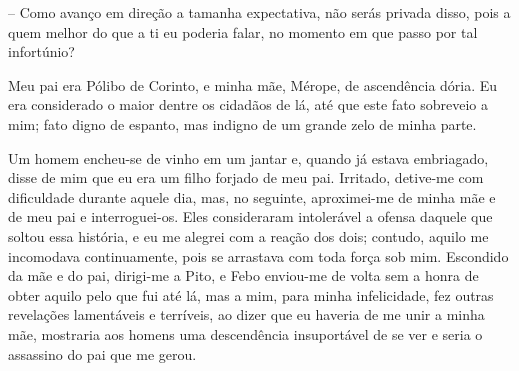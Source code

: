  --   Como avanço em direção a tamanha expectativa, não serás privada disso,
pois a quem melhor do que a ti eu poderia falar, no momento em que passo
por tal infortúnio?

Meu pai era Pólibo de Corinto, e minha mãe, Mérope, de ascendência
dória. Eu era considerado o maior dentre os cidadãos de lá, até que este
fato sobreveio a mim; fato digno de espanto, mas indigno de um grande
zelo de minha parte.

 Um homem encheu-se de vinho em um jantar e, quando já estava
embriagado, disse de mim que eu era um filho forjado de meu pai.
Irritado, detive-me com dificuldade durante aquele dia, mas, no
seguinte, aproximei-me de minha mãe e de meu pai e interroguei-os. Eles
consideraram intolerável a ofensa daquele que soltou essa história, e eu
me alegrei com a reação dos dois; contudo, aquilo me incomodava
continuamente, pois se arrastava com toda força sob mim. Escondido da
mãe e do pai, dirigi-me a Pito, e Febo enviou-me de volta sem a honra de
obter aquilo pelo que fui até  lá, mas a mim, para minha
infelicidade, fez outras revelações lamentáveis e terríveis, ao dizer
que eu haveria de me unir a minha mãe, mostraria aos homens uma
descendência insuportável de se ver e seria o assassino do pai que me
gerou.


